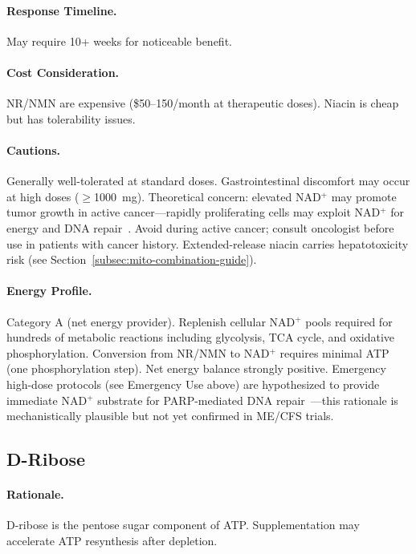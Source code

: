 \paragraph{Response Timeline.} May require 10+ weeks for noticeable benefit.

\paragraph{Cost Consideration.} NR/NMN are expensive (\$50--150/month at therapeutic doses). Niacin is cheap but has tolerability issues.

\paragraph{Cautions.} Generally well-tolerated at standard doses. Gastrointestinal discomfort may occur at high doses ($\geq$1000~mg). Theoretical concern: elevated NAD$^+$ may promote tumor growth in active cancer---rapidly proliferating cells may exploit NAD$^+$ for energy and DNA repair~\cite{Palmer2021NADcancer}. Avoid during active cancer; consult oncologist before use in patients with cancer history. Extended-release niacin carries hepatotoxicity risk (see Section~\ref{subsec:mito-combination-guide}).

\paragraph{Energy Profile.}
Category A (net energy provider). Replenish cellular NAD$^+$ pools required for hundreds of metabolic reactions including glycolysis, TCA cycle, and oxidative phosphorylation. Conversion from NR/NMN to NAD$^+$ requires minimal ATP (one phosphorylation step). Net energy balance strongly positive. Emergency high-dose protocols (see Emergency Use above) are hypothesized to provide immediate NAD$^+$ substrate for PARP-mediated DNA repair~\cite{Dehhaghi2022AD}---this rationale is mechanistically plausible but not yet confirmed in ME/CFS trials.

\subsection{D-Ribose}

\paragraph{Rationale.} D-ribose is the pentose sugar component of ATP. Supplementation may accelerate ATP resynthesis after depletion.

